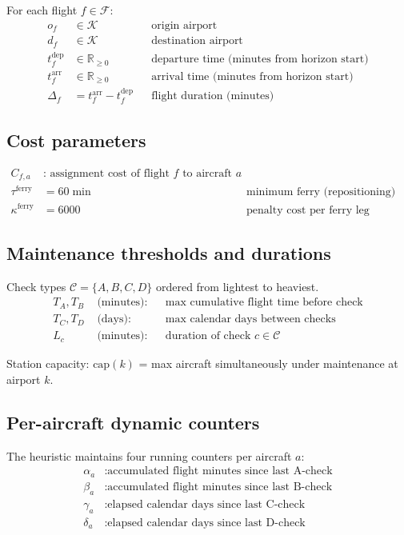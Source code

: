 \documentclass[11pt, a4paper]{article}
\theoremstyle{plain}
\theoremstyle{definition}
\theoremstyle{remark}
\newcommand{\F}{\mathcal{F}}
\newcommand{\K}{\mathcal{K}}
\newcommand{\C}{\mathcal{C}}
\begin{document}
For each flight $f \in \F$:
\begin{align*}
  o_f &\in \K   &&\text{origin airport} \\
  d_f &\in \K   &&\text{destination airport} \\
  t_f^{\mathrm{dep}} &\in \mathbb{R}_{\ge 0} &&\text{departure time (minutes from horizon start)} \\
  t_f^{\mathrm{arr}} &\in \mathbb{R}_{\ge 0} &&\text{arrival time (minutes from horizon start)} \\
  \Delta_f &= t_f^{\mathrm{arr}} - t_f^{\mathrm{dep}} &&\text{flight duration (minutes)}
\end{align*}

\subsection{Cost parameters}

\begin{align*}
  C_{f,a}       &\text{: assignment cost of flight } f \text{ to aircraft } a \\
  \tau^{\mathrm{ferry}} &= 60\;\text{min} &&\text{minimum ferry (repositioning) time} \\
  \kappa^{\mathrm{ferry}} &= 6000 &&\text{penalty cost per ferry leg}
\end{align*}

\subsection{Maintenance thresholds and durations}

Check types $\C = \{A, B, C, D\}$ ordered from lightest to heaviest.
\begin{align*}
  T_A, T_B &\text{ (minutes)}: &&\text{max cumulative flight time before check} \\
  T_C, T_D &\text{ (days)}:    &&\text{max calendar days between checks} \\
  L_c       &\text{ (minutes)}: &&\text{duration of check } c \in \C
\end{align*}

Station capacity: $\mathrm{cap}(k)$ = max aircraft simultaneously under
maintenance at airport $k$.

\subsection{Per-aircraft dynamic counters}

The heuristic maintains four running counters per aircraft $a$:
\begin{align*}
  \alpha_a &: \text{accumulated flight minutes since last A-check}\\
  \beta_a  &: \text{accumulated flight minutes since last B-check}\\
  \gamma_a &: \text{elapsed calendar days since last C-check}\\
  \delta_a &: \text{elapsed calendar days since last D-check}
\end{align*}
\end{document}
